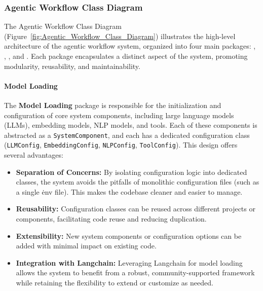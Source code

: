 \documentclass[../Main.tex]{subfiles}
\begin{document}
	\subsubsection{Agentic Workflow Class Diagram}
	\label{section:4.1.3.4_agentic_workflow_class_diagram}

	The Agentic Workflow Class Diagram (Figure~\ref{fig:Agentic_Workflow_Class_Diagram})
	illustrates the high-level architecture of the agentic workflow system,
	organized into four main packages: , ,
	, and . Each package encapsulates a
	distinct aspect of the system, promoting modularity, reusability, and
	maintainability.

	\paragraph{Model Loading}
	The \textbf{Model Loading} package is responsible for the initialization and
	configuration of core system components, including large language models (LLMs),
	embedding models, NLP models, and tools. Each of these components is abstracted
	as a \texttt{SystemComponent}, and each has a dedicated configuration class (\texttt{LLMConfig},
	\texttt{EmbeddingConfig}, \texttt{NLPConfig}, \texttt{ToolConfig}). This design
	offers several advantages:
	\begin{itemize}
		\item \textbf{Separation of Concerns:} By isolating configuration logic into
			dedicated classes, the system avoids the pitfalls of monolithic configuration
			files (such as a single \.env file). This makes the codebase cleaner and easier
			to manage.

		\item \textbf{Reusability:} Configuration classes can be reused across
			different projects or components, facilitating code reuse and reducing duplication.

		\item \textbf{Extensibility:} New system components or configuration options
			can be added with minimal impact on existing code.

		\item \textbf{Integration with Langchain:} Leveraging Langchain for model
			loading allows the system to benefit from a robust, community-supported framework
			while retaining the flexibility to extend or customize as needed.
	\end{itemize}
\end{document}
